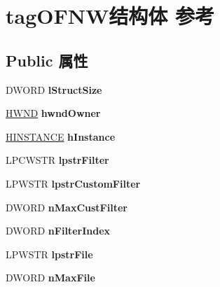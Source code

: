 \hypertarget{structtag_o_f_n_w}{}\section{tag\+O\+F\+N\+W结构体 参考}
\label{structtag_o_f_n_w}
\subsection*{Public 属性}
\begin{DoxyCompactItemize}
\item 
\mbox{\label{structtag_o_f_n_w_ac0808907740e28c65351276d1bf87f79}} 
D\+W\+O\+RD {\bfseries l\+Struct\+Size}
\item 
\mbox{\label{structtag_o_f_n_w_a0f60bf1606c2ad17e5509ff09789da94}} 
\hyperlink{interfacevoid}{H\+W\+ND} {\bfseries hwnd\+Owner}
\item 
\mbox{\label{structtag_o_f_n_w_a09e72307ceaafbf95f2a74c4ceed09e3}} 
\hyperlink{interfacevoid}{H\+I\+N\+S\+T\+A\+N\+CE} {\bfseries h\+Instance}
\item 
\mbox{\label{structtag_o_f_n_w_ae36d68d04b8ec7df9e67c971f978a04b}} 
L\+P\+C\+W\+S\+TR {\bfseries lpstr\+Filter}
\item 
\mbox{\label{structtag_o_f_n_w_a9539b74f2dc89a017a9ecfba7c34188e}} 
L\+P\+W\+S\+TR {\bfseries lpstr\+Custom\+Filter}
\item 
\mbox{\label{structtag_o_f_n_w_a4e046f3a0b5461cc58f19d4b12742d90}} 
D\+W\+O\+RD {\bfseries n\+Max\+Cust\+Filter}
\item 
\mbox{\label{structtag_o_f_n_w_af2da5f6e4cd0a059300064e3ef01f1df}} 
D\+W\+O\+RD {\bfseries n\+Filter\+Index}
\item 
\mbox{\label{structtag_o_f_n_w_a4d85e332d5d7b03aea63411bf3b1d585}} 
L\+P\+W\+S\+TR {\bfseries lpstr\+File}
\item 
\mbox{\label{structtag_o_f_n_w_ac667da0cc376e85d4e153a0f590ffbc2}} 
D\+W\+O\+RD {\bfseries n\+Max\+File}
\item 

\end{DoxyCompactItemize}
